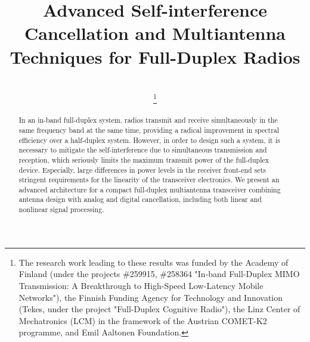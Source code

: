 \documentclass[conference,twoside,letterpaper,10pt]{IEEEtran}
\begin{document}
\title{Advanced Self-interference Cancellation and Multiantenna Techniques for Full-Duplex Radios}






\author{
\\
\vspace{2mm}
\thanks{The research work leading to these results was funded by the Academy of Finland (under the projects \#259915, \#258364 "In-band Full-Duplex MIMO Transmission: A Breakthrough to High-Speed Low-Latency Mobile Networks"), the Finnish Funding Agency for Technology and Innovation (Tekes, under the project "Full-Duplex Cognitive Radio"), the Linz Center of Mechatronics (LCM) in the framework of the Austrian COMET-K2 programme, and Emil Aaltonen Foundation.}}








\maketitle

\begin{abstract}
In an in-band full-duplex system, radios transmit and receive simultaneously in the same frequency band at the same time, providing a radical improvement in spectral efficiency over a half-duplex system. However, in order to design such a system, it is necessary to mitigate the self-interference  due to simultaneous transmission and reception, which seriously limits the maximum transmit power of the full-duplex device. Especially, large differences in power levels in the receiver front-end sets stringent requirements for the linearity of the transceiver electronics. We present an advanced architecture for a compact full-duplex multiantenna transceiver combining antenna design with analog and digital cancellation, including both linear and nonlinear signal processing.
\end{abstract}
\end{document}
